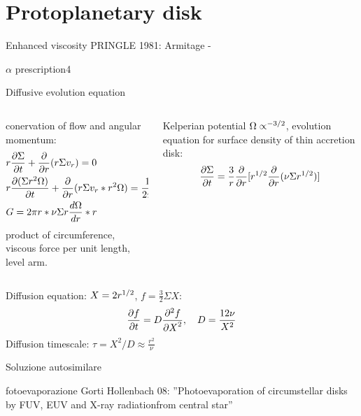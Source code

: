 \section{Protoplanetary disk}

\begin{wordonframe}{Enhanced viscosity}
PRINGLE 1981:
Armitage - 
\end{wordonframe}

\begin{frame}{$\alpha$ prescription4}

\end{frame}

\begin{frame}{Diffusive evolution equation}
\begin{columns}[T]\begin{column}{0.5\textwidth}
conervation of flow and angular momentum:
\begin{align*}
&r\PDy{t}{\Sigma}+\PDof{r}(r\Sigma v_r)=0\\
&r\PDy{t}{(\Sigma r^2\Omega)}+\PDof{r}(r\Sigma v_r*r^2\Omega)=\frac{1}{2\pi}\PDy{r}{G}\\
&G=2\pi r*\nu\Sigma r\TDy{r}{\Omega}*r
\end{align*}
product of circumference, viscous force per unit length, level arm.
\end{column}\begin{column}{0.5\textwidth}
Kelperian potential $\Omega\propto\expy{-3/2}$, evolution equation for  surface density of thin accretion disk:
\[\PDy{t}{\Sigma}=\frac{3}{r}\PDof{r}[r\expy{1/2}\PDof{r}(\nu\Sigma r\expy{1/2})]\]
\end{column}\end{columns}
Diffusion equation: $X=2r\expy{1/2}$, $f=\frac{3}{2}\Sigma X$:
\[\PDy{t}{f}=D\PtwoDy{X}{f},\quad D=\frac{12\nu}{X^2}\]
Diffusion timescale: $\tau=X^2/D\approx\frac{r^2}{\nu}$
\end{frame}

\begin{frame}{Soluzione autosimilare}

\end{frame}

\begin{frame}{fotoevaporazione}
Gorti Hollenbach 08: ''Photoevaporation of circumstellar disks by FUV, EUV and X-ray radiationfrom central star''
\end{frame}